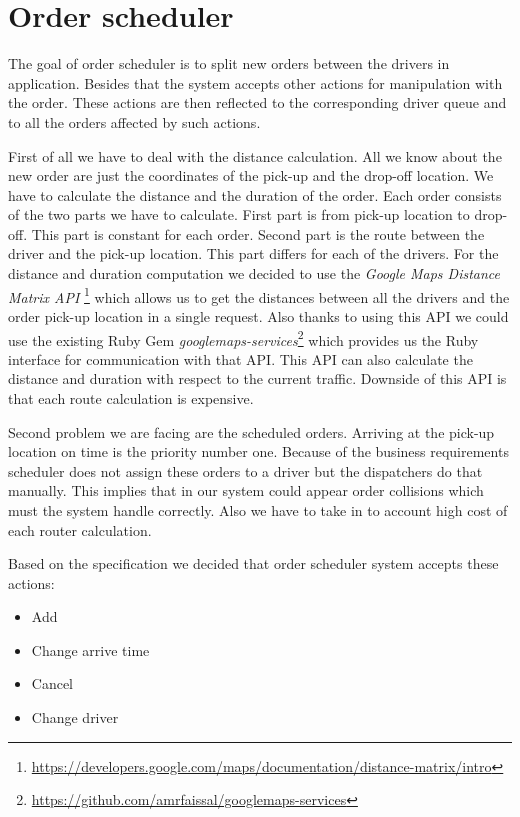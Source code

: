 \section {Order scheduler}

The goal of order scheduler is to split new orders between the drivers in application. Besides that the system accepts other actions for manipulation with the order. These actions are then reflected to the corresponding driver queue and to all the orders affected by such actions.

First of all we have to deal with the distance calculation. All we know about the new order are just the coordinates of the pick-up and the drop-off location. We have to calculate the distance and the duration of the order. Each order consists of the two parts we have to calculate. First part is from pick-up location to drop-off. This part is constant for each order. Second part is the route between the driver and the pick-up location. This part differs for each of the drivers. For the distance and duration computation we decided to use the \textit{Google Maps Distance Matrix API} \footnote{\url{https://developers.google.com/maps/documentation/distance-matrix/intro}} which allows us to get the distances between all the drivers and the order pick-up location in a single request. Also thanks to using this API we could use the existing Ruby Gem \textit{googlemaps-services}\footnote{\url{https://github.com/amrfaissal/googlemaps-services}} which provides us the Ruby interface for communication with that API. This API can also calculate the distance and duration with respect to the current traffic. Downside of this API is that each route calculation is expensive.

Second problem we are facing are the scheduled orders. Arriving at the pick-up location on time is the priority number one. Because of the business requirements scheduler does not assign these orders to a driver but the dispatchers do that manually. This implies that in our system could appear order collisions which must the system handle correctly. Also we have to take in to account high cost of each router calculation.

Based on the specification we decided that order scheduler system accepts these actions:
\begin{itemize}
	\item Add
	\item Change arrive time
	\item Cancel
	\item Change driver
\end{itemize}


